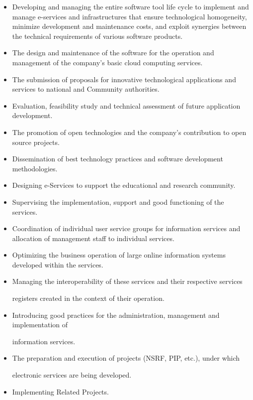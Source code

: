 \begin{itemize}
	
	\item Developing and managing the entire software tool life cycle to implement and manage e-services
	and infrastructures that ensure technological homogeneity, minimize development and maintenance costs,
	and exploit synergies between the technical requirements of various software products.
	
	\item The design and maintenance of the software for the operation and management of the company's basic cloud computing services.
	
	\item The submission of proposals for innovative technological applications and services to national and Community authorities.
	
	\item Evaluation, feasibility study and technical assessment of future application development.
	
	\item  The promotion of open technologies and the company's contribution to open source projects.
	
	\item Dissemination of best technology practices and software development methodologies.
	
	\item Designing e-Services to support the educational and research community.
	
	\item Supervising the implementation, support and good functioning of the services.
	
	\item Coordination of individual user service groups for information services and allocation of management staff to individual services.
	
	\item Optimizing the business operation of large online information systems developed within the services.
	
	\item Managing the interoperability of these services and their respective services
	
	registers created in the context of their operation.
	
	\item Introducing good practices for the administration, management and implementation of
	
	information services.
	
	\item The preparation and execution of projects (NSRF, PIP, etc.), under which
	
	electronic services are being developed.
	
	\item Implementing Related Projects.
\end{itemize}

